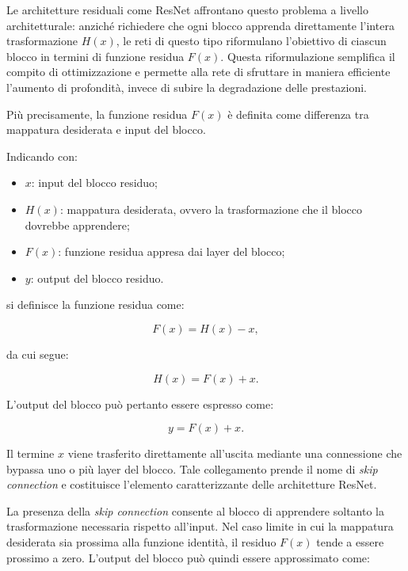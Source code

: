 Le architetture residuali come ResNet affrontano questo problema a livello architetturale: anziché richiedere che ogni blocco apprenda direttamente l'intera trasformazione $H(x)$, le reti di questo tipo riformulano
l'obiettivo di ciascun blocco in termini di funzione residua $F(x)$. Questa riformulazione semplifica il compito di ottimizzazione e permette alla rete di sfruttare in maniera efficiente l'aumento di profondità, invece di 
subire la degradazione delle prestazioni.

Più precisamente, la funzione residua $F(x)$ è definita come differenza tra mappatura desiderata e input del blocco. 

Indicando con:

\begin{itemize}
    \item $x$: input del blocco residuo;
    \item $H(x)$: mappatura desiderata, ovvero la trasformazione che il blocco dovrebbe apprendere;
    \item $F(x)$: funzione residua appresa dai layer del blocco;
    \item $y$: output del blocco residuo.
\end{itemize}

si definisce la funzione residua come:

\begin{equation}
F(x) = H(x) - x,
\end{equation}

da cui segue:

\begin{equation}
H(x) = F(x) + x.
\end{equation}

L'output del blocco può pertanto essere espresso come:

\begin{equation}
y = F(x) + x.
\end{equation}

Il termine $x$ viene trasferito direttamente all'uscita mediante una connessione che bypassa uno o più layer del blocco. Tale collegamento prende il nome di \textit{skip connection} e costituisce l'elemento caratterizzante delle architetture ResNet.

La presenza della \textit{skip connection} consente al blocco di apprendere soltanto la trasformazione necessaria rispetto all'input. Nel caso limite in cui la mappatura desiderata sia prossima alla funzione identità, il residuo $F(x)$ tende a essere prossimo a zero. L'output del blocco può quindi essere approssimato come:

